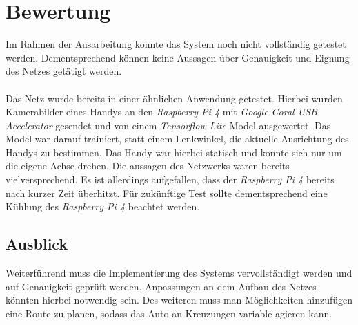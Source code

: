 \documentclass[a4paper, 12pt]{scrartcl}
\begin{document}
	\section{Bewertung}
	Im Rahmen der Ausarbeitung konnte das System noch nicht vollständig getestet werden. Dementsprechend können keine Aussagen über Genauigkeit und Eignung des Netzes getätigt werden. \\ \\
	Das Netz wurde bereits in einer ähnlichen Anwendung getestet. Hierbei wurden Kamerabilder eines Handys an den \emph{Raspberry Pi 4} mit \emph{Google Coral USB Accelerator} gesendet und von einem \emph{Tensorflow Lite} Model ausgewertet. Das Model war darauf trainiert, statt einem Lenkwinkel, die aktuelle Ausrichtung des Handys zu bestimmen. Das Handy war hierbei statisch und konnte sich nur um die eigene Achse drehen. Die aussagen des Netzwerks waren bereits vielversprechend. Es ist allerdings aufgefallen, dass der \emph{Raspberry Pi 4} bereits nach kurzer Zeit überhitzt. Für zukünftige Test sollte dementsprechend eine Kühlung des \emph{Raspberry Pi 4} beachtet werden.
	
		\subsection {Ausblick}
		Weiterführend muss die Implementierung des Systems vervollständigt werden und auf Genauigkeit geprüft werden. Anpassungen an dem Aufbau des Netzes könnten hierbei notwendig sein. Des weiteren muss man Möglichkeiten hinzufügen eine Route zu planen, sodass das Auto an Kreuzungen variable agieren kann.
		
	
		
	
	
	\nocite{*}
	
\end{document}
